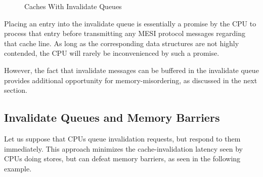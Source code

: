 \begin{figure}[htb]
\begin{center}
\end{center}
\caption{Caches With Invalidate Queues}
\label{fig:app:whymb:Caches With Invalidate Queues}
\end{figure}

Placing an entry into the invalidate queue is essentially a promise
by the CPU to process that entry before transmitting any MESI protocol
messages regarding that cache line.
As long as the corresponding data structures are not highly contended,
the CPU will rarely be inconvenienced by such a promise.

However, the fact that invalidate messages can be buffered in the
invalidate queue provides additional opportunity for memory-misordering,
as discussed in the next section.

\subsection{Invalidate Queues and Memory Barriers}
\label{sec:app:whymb:Invalidate Queues and Memory Barriers}

Let us suppose that CPUs queue invalidation requests, but respond to
them immediately.
This approach minimizes the cache-invalidation latency seen by CPUs
doing stores, but can defeat memory barriers, as seen in the following
example.

